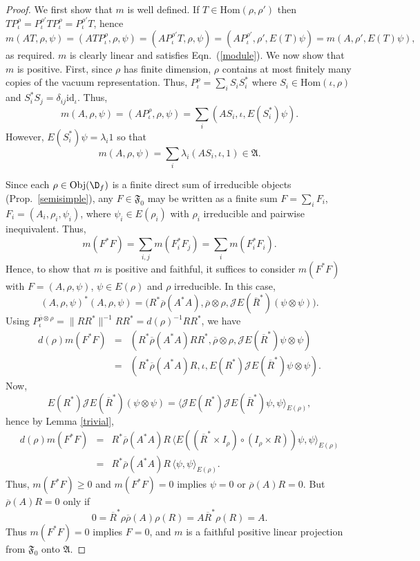 \documentclass[11pt]{article}
\newcommand{\alg}[1]{\mathfrak{#1}}
\newcommand{\norm}[1]{\| #1\|}
\theoremstyle{definition}
\theoremstyle{definition}
\theoremstyle{remark}
\newcommand{\Obj}{\mathrm{Obj}}
\def\2#1{{\mathcal #1}}
\def\ol#1{{\overline #1}}
\newcommand{\Hom}{\mathrm{Hom}}
\def\id{\mathrm{id}}
\begin{document}
\begin{proof} We first show that $m$ is well defined.  If $T\in \Hom (\rho ,\rho ')$
  then $TP_{\iota}^{\rho}=P_{\iota}^{\rho '}TP_{\iota}^{\rho}=P_{\iota}^{\rho'}T$,
  hence
$$ m(AT,\rho ,\psi )=(ATP_{\iota}^{\rho},\rho ,\psi )=(AP_{\iota}^{\rho '}T,\rho ,\psi )=(AP_{\iota}^{\rho'},\rho ',E(T)\psi
)=m(A,\rho ',E(T)\psi ) ,$$ as required.  $m$ is clearly linear and satisfies Eqn.\
(\ref{module}).  We now show that $m$ is positive.  First, since $\rho$ has finite
dimension, $\rho$ contains at most finitely many copies of the vacuum representation.
Thus, $P_{\iota}^{\rho}=\sum _iS_iS_i^*$ where $S_i\in \Hom (\iota ,\rho )$ and
$S_i^*S_j=\delta _{ij}\id _\iota $.  Thus,
$$ m(A,\rho ,\psi )=(AP_{\iota}^{\rho},\rho ,\psi )=\sum _i(AS_i,\iota ,E(S_i^*)\psi) .$$
However, $E(S_i^*)\psi =\lambda _i1$ so that
$$ m(A,\rho ,\psi )=\sum _i\lambda _i(AS_i,\iota ,1) \in \alg{A} .$$

Since each $\rho \in \Obj (\D _f )$ is a finite direct sum of irreducible objects
(Prop.\ \ref{semisimple}), any $F\in \alg{F}_0 $ may be written as a finite sum
$F=\sum _iF_i$, $F_i=(A_i,\rho _i,\psi _i)$, where $\psi _i\in E(\rho _i)$ with $\rho
_i$ irreducible and pairwise inequivalent.  Thus,
$$ m(F^*F)= \sum _{i,j}m(F_i^*F_j)=\sum _im(F_i^*F_i) .$$
Hence, to show that $m$ is positive and faithful, it suffices to consider $m(F^*F)$
with $F=(A,\rho ,\psi )$, $\psi \in E(\rho)$ and $\rho$ irreducible.  In this case,
$$ (A,\rho ,\psi )^*(A,\rho ,\psi )=\bigl( R^*\ol\rho (A^*A),\ol\rho \otimes \rho ,\2JE(\ol R^*)(\psi \otimes \psi )\bigr).$$
Using $P^{\ol\rho \otimes \rho }_{\iota}=\norm{RR^*}^{-1}RR^*=d(\rho )^{-1}RR^*$, we
have
\begin{eqnarray*} d(\rho )m(F^*F) &=& (R^*\ol\rho (A^*A)RR^*,\ol\rho \otimes \rho
  ,\2JE(\ol R^*)\psi \otimes \psi ) \\
  &=& (R^*\ol\rho (A^*A)R,\iota ,E(R^*)\2JE(\ol R^*)\psi \otimes \psi )
  .\end{eqnarray*} Now,
$$ E(R^*)\2JE(\ol R^*)(\psi \otimes \psi)=\bigl\langle \2JE(R^*)\2JE(\ol R^*)\psi
,\psi \bigr\rangle _{E(\rho )} ,$$ hence by Lemma \ref{trivial},
\begin{eqnarray*} d(\rho )m(F^*F) &=& R^*\ol \rho (A^*A)R \, \bigl\langle E((\ol
  R^*\times I _{\rho})\circ
  (I_{\rho}\times R))\psi ,\psi \bigr\rangle _{E(\rho )} \\
  &=& R^*\ol \rho (A^*A)R \,\bigl\langle \psi ,\psi \bigr\rangle _{E(\rho )}
  .\end{eqnarray*} Thus, $m(F^*F)\geq 0$ and $m(F^*F)=0$ implies $\psi =0$ or $\ol
\rho (A)R=0$.  But $\ol \rho (A)R=0$ only if
$$ 0=\ol R^*\rho \ol \rho (A)\rho (R) = A\ol R^*\rho (R) = A.$$
Thus $m(F^*F)=0$ implies $F=0$, and $m$ is a faithful positive linear projection from
$\alg{F}_0 $ onto $\alg{A}$.  \end{proof}
\end{document}
